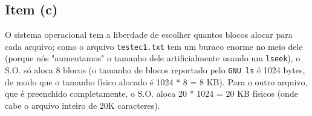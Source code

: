 \documentclass{article}
\begin{document}
\subsection*{Item (c)}

O sistema operacional tem a liberdade de escolher quantos blocos alocar para cada arquivo; como o arquivo \texttt{testec1.txt} tem um buraco enorme no meio dele (porque nós "aumentamos" o tamanho dele artificialmente usando um \texttt{lseek}), o S.O. só aloca 8 blocos (o tamanho de blocos reportado pelo \texttt{GNU ls} é 1024 bytes, de modo que o tamanho físico alocado é 1024 * 8 = 8 KB). Para o outro arquivo, que é preenchido completamente, o S.O. aloca 20 * 1024 = 20 KB físicos (onde cabe o arquivo inteiro de 20K caracteres).
\end{document}
